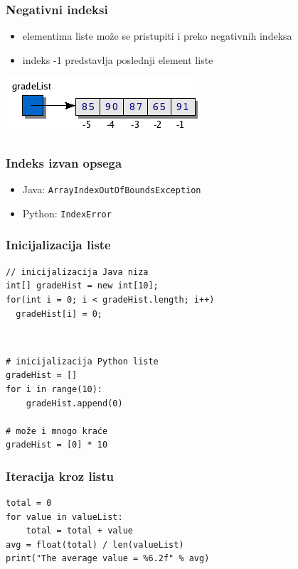 \documentclass[compress]{beamer}
\begin{document}
\begin{frame}[fragile]
  \frametitle{Negativni indeksi}
  \begin{itemize}
    \item elementima liste može se pristupiti i preko negativnih indeksa
    \item indeks -1 predstavlja poslednji element liste
  \end{itemize}
  \begin{center}
    \includegraphics[scale=0.7]{list2.png}
  \end{center}
\end{frame}

\begin{frame}[fragile]
  \frametitle{Indeks izvan opsega}
  \begin{itemize}
    \item Java: \texttt{ArrayIndexOutOfBoundsException}
    \item Python: \texttt{IndexError}
  \end{itemize}
\end{frame}

\begin{frame}[fragile]
\frametitle{Inicijalizacija liste}
\begin{verbatim}
// inicijalizacija Java niza
int[] gradeHist = new int[10];
for(int i = 0; i < gradeHist.length; i++)
  gradeHist[i] = 0;
\end{verbatim}

\ %

\begin{verbatim}
# inicijalizacija Python liste
gradeHist = []
for i in range(10):
    gradeHist.append(0)

# može i mnogo kraće
gradeHist = [0] * 10
\end{verbatim}
\end{frame}

\begin{frame}[fragile]
\frametitle{Iteracija kroz listu}
\begin{verbatim}
total = 0
for value in valueList:
    total = total + value
avg = float(total) / len(valueList)
print("The average value = %6.2f" % avg)
\end{verbatim}
\end{frame}
\end{document}
